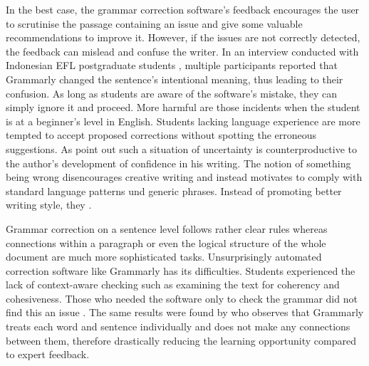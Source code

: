 \documentclass[runningheads]{llncs}
\let\OldTextregistered\textregistered
\renewcommand{\textregistered}{\OldTextregistered\xspace}%
\begin{document}
In the best case, the grammar correction software's feedback encourages the user to scrutinise the passage containing an issue and give some valuable recommendations to improve it. However, if the issues are not correctly detected, the feedback can mislead and confuse the writer. In an interview conducted with Indonesian EFL postgraduate students \citep{nova_utilizing_2018}, multiple participants reported that Grammarly\textregistered changed the sentence's intentional meaning, thus leading to their confusion. As long as students are aware of the software's mistake, they can simply ignore it and proceed. More harmful are those incidents when the student is at a beginner's level in English. Students lacking language experience are more tempted to accept proposed corrections without spotting the erroneous suggestions. As \textcite{vojak_new_2011} point out such a situation of uncertainty is counterproductive to the author's development of confidence in his writing. The notion of something being wrong disencourages creative writing and instead motivates to comply with standard language patterns und generic phrases. Instead of promoting better writing style, they . 

Grammar correction on a sentence level follows rather clear rules whereas connections within a paragraph or even the logical structure of the whole document are much more sophisticated tasks. Unsurprisingly automated correction software like Grammarly\textregistered has its difficulties. Students experienced the lack of context-aware checking such as examining the text for coherency and cohesiveness. Those who needed the software only to check the grammar did not find this an issue \citep{nova_utilizing_2018}. The same results were found by \textcite{dembsey_closing_2017} who observes that Grammarly\textregistered treats each word and sentence individually and does not make any connections between them, therefore drastically reducing the learning opportunity compared to expert feedback.
\end{document}
